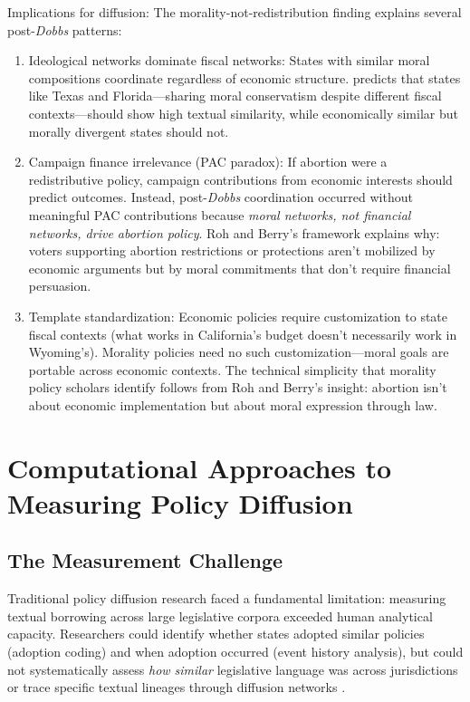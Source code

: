 Implications for diffusion: The morality-not-redistribution finding explains several post-\textit{Dobbs} patterns:
\begin{enumerate}
    \item Ideological networks dominate fiscal networks: States with similar moral compositions coordinate regardless of economic structure. \textcite{rohModelingOutcomesState2008} predicts that states like Texas and Florida---sharing moral conservatism despite different fiscal contexts---should show high textual similarity, while economically similar but morally divergent states should not.
    \item Campaign finance irrelevance (PAC paradox): If abortion were a redistributive policy, campaign contributions from economic interests should predict outcomes. Instead, post-\textit{Dobbs} coordination occurred without meaningful PAC contributions because \textit{moral networks, not financial networks, drive abortion policy}. Roh and Berry's framework explains why: voters supporting abortion restrictions or protections aren't mobilized by economic arguments but by moral commitments that don't require financial persuasion.
    \item Template standardization: Economic policies require customization to state fiscal contexts (what works in California's budget doesn't necessarily work in Wyoming's). Morality policies need no such customization---moral goals are portable across economic contexts. The technical simplicity that morality policy scholars identify follows from Roh and Berry's insight: abortion isn't about economic implementation but about moral expression through law.
\end{enumerate}

\section{Computational Approaches to Measuring Policy Diffusion}
\label{sec:methods}

\subsection{The Measurement Challenge}
Traditional policy diffusion research faced a fundamental limitation: measuring textual borrowing across large legislative corpora exceeded human analytical capacity. Researchers could identify whether states adopted similar policies (adoption coding) and when adoption occurred (event history analysis), but could not systematically assess \emph{how similar} legislative language was across jurisdictions or trace specific textual lineages through diffusion networks \parencite{grimmerTextDataPromise2013}.

